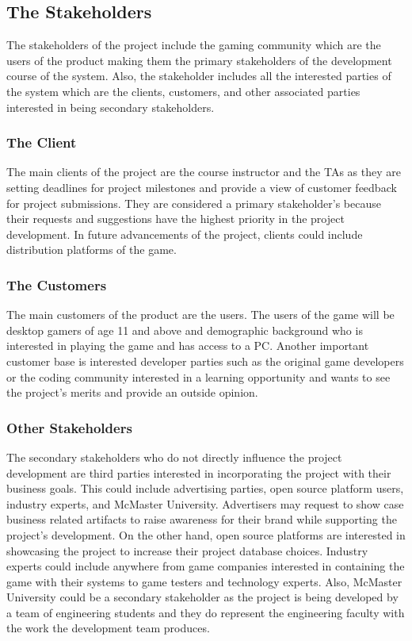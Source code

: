 \documentclass[12pt, titlepage]{article}
\begin{document}
\subsection{The Stakeholders}

The stakeholders of the project include the gaming community which are the users of the product making them the primary stakeholders of the development course of the system. Also, the stakeholder includes all the interested parties of the system which are the clients, customers, and other associated parties interested in being secondary stakeholders. 

\subsubsection{The Client} 

The main clients of the project are the course instructor and the TAs as they are setting deadlines for project milestones and provide a view of customer feedback for project submissions. They are considered a primary stakeholder's because their requests and suggestions have the highest priority in the project development. In future advancements of the project, clients could include distribution platforms of the game. 

\subsubsection{The Customers}

The main customers of the product are the users. The users of the game will be desktop gamers of age 11 and above and demographic background who is interested in playing the game and has access to a PC. Another important customer base is interested developer parties such as the original game developers or the coding community interested in a learning opportunity and wants to see the project's merits and provide an outside opinion. 

\subsubsection{Other Stakeholders}

The secondary stakeholders who do not directly influence the project development are third parties interested in incorporating the project with their business goals. This could include advertising parties, open source platform users, industry experts, and McMaster University. Advertisers may request to show case business related artifacts to raise awareness for their brand while supporting the project's development. On the other hand, open source platforms are interested in showcasing the project to increase their project database choices. 
Industry experts could include anywhere from game companies interested in containing the game with their systems to game testers and technology experts. Also, McMaster University could be a secondary stakeholder as the project is being developed by a team of engineering students and they do represent the engineering faculty with the work the development team produces. 
\end{document}
